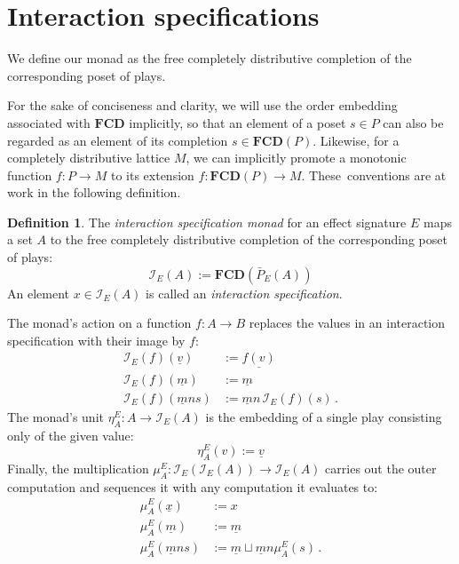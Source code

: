\documentclass[draft,11pt]{report}
\theoremstyle{definition}
\newtheorem{definition}[theorem]{Definition}
\begin{document}
\section{Interaction specifications} %

We define our monad as the free completely distributive completion
of the corresponding poset of plays.

For the sake of conciseness and clarity,
we will use the order embedding associated with $\mathbf{FCD}$
implicitly,
so that an element of a poset $s \in P$
can also be regarded as an element of
its completion $s \in \mathbf{FCD}(P)$.
Likewise,
for a completely distributive lattice $M$,
we can implicitly
promote a monotonic function
$f : P \rightarrow M$
to its extension
$f : \mathbf{FCD}(P) \rightarrow M$.
These~conventions are at work
in the following definition.

\begin{definition} \label{def:intm} %
The \emph{interaction specification monad}
for an effect signature $E$
maps a set $A$
to the free completely distributive completion
of the corresponding poset of plays:
\[
    \mathcal{I}_E(A) :=
      \mathbf{FCD}(\bar{P}_E(A))
\]
An element $x \in \mathcal{I}_E(A)$ is called
an \emph{interaction specification}.

The monad's action on a function $f : A \rightarrow B$
replaces the values in
an interaction specification with their image by $f$:
\begin{align*}
  \mathcal{I}_E(f)(\underline{v}) &:= \underline{f(v)} \\
  \mathcal{I}_E(f)(\underline{m}) &:= \underline{m} \\
  \mathcal{I}_E(f)(\underline{m} n s) &:=
    \underline{m} n \, \mathcal{I}_E(f)(s) \,.
\end{align*}
The monad's unit
$\eta^E_A : A \rightarrow \mathcal{I}_E(A)$
is the embedding of a single play
consisting only of the given value:
\[
    \eta^E_A(v) := \underline{v}
\]
Finally, the multiplication
$\mu^E_A : \mathcal{I}_E(\mathcal{I}_E(A)) \rightarrow \mathcal{I}_E(A)$
carries out the outer computation and
sequences it with any computation it evaluates to:
\begin{align*}
  \mu^E_A(\underline{x}) &:= x \\
  \mu^E_A(\underline{m}) &:= \underline{m} \\
  \mu^E_A(\underline{m} n s) &:=
    \underline{m} \sqcup \underline{m} n \mu^E_A(s) \,.
\end{align*}
\end{definition}
\end{document}
